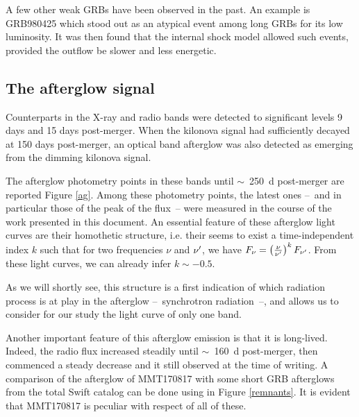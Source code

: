 A few other weak GRBs have been observed in the past. An example is GRB980425 which stood out as an atypical event among long GRBs for its low luminosity. It was then found \citep{50} that the internal shock model allowed such events, provided the outflow be slower and less energetic.


\subsection{The afterglow signal}
\label{ags}
Counterparts in the X-ray and radio bands were detected to significant levels 9 days and 15 days post-merger. When the kilonova signal had sufficiently decayed at 150 days post-merger, an optical band afterglow was also detected as emerging from the dimming kilonova signal.

The afterglow photometry points in these bands until $\sim$~250~d post-merger are reported Figure \ref{ag}. Among these photometry points, the latest ones --~and in particular those of the peak of the flux~-- were measured in the course of the work presented in this document. An essential feature of these afterglow light curves are their homothetic structure, i.e. their seems to exist a time-independent index $k$ such that for two frequencies $\nu$ and $\nu^{\prime}$, we have $F_\nu = \left( \frac{\nu}{\nu^{\prime}} \right)^k F_{\nu^{\prime}}$. From these light curves, we can already infer $k \sim -0.5$.


As we will shortly see, this structure is a first indication of which radiation process is at play in the afterglow --~synchrotron radiation~--, and allows us to consider for our study the light curve of only one band.


Another important feature of this afterglow emission is that it is long-lived. Indeed, the radio flux increased steadily until $\sim$~160~d post-merger, then commenced a steady decrease and it still observed at the time of writing. A comparison of the afterglow of MMT170817 with some short GRB afterglows from the total Swift catalog can be done using in Figure \ref{remnants}. It is evident that MMT170817 is peculiar with respect of all of these.


